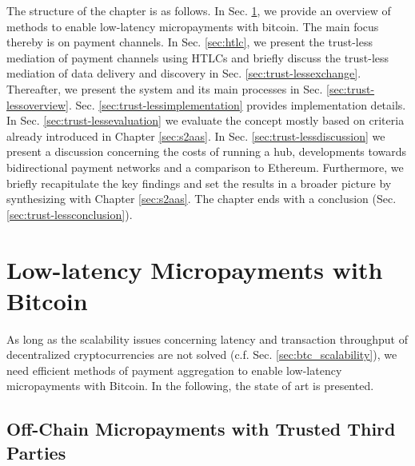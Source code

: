 The structure of the chapter is as follows. In Sec. \ref{sec:micropayments}, we provide an overview of methods to enable low-latency micropayments with bitcoin. The main focus thereby is on payment channels. In Sec. \ref{sec:htlc}, we present the trust-less mediation of payment channels using \ac{HTLC}s and briefly discuss the trust-less mediation of data delivery and discovery in Sec. \ref{sec:trust-lessexchange}. Thereafter, we present the system and its main processes in Sec. \ref{sec:trust-lessoverview}. Sec. \ref{sec:trust-lessimplementation} provides implementation details. In Sec. \ref{sec:trust-lessevaluation} we evaluate the concept mostly based on criteria already introduced in Chapter \ref{sec:s2aas}. In Sec. \ref{sec:trust-lessdiscussion} we present a discussion concerning the costs of running a hub, developments towards bidirectional payment networks and a comparison to Ethereum. Furthermore, we briefly recapitulate the key findings and set the results in a broader picture by synthesizing with Chapter \ref{sec:s2aas}. The chapter ends with a conclusion (Sec. \ref{sec:trust-lessconclusion}).


\section{Low-latency Micropayments with Bitcoin}
\label{sec:micropayments}

As long as the scalability issues concerning latency and transaction throughput of decentralized cryptocurrencies are not solved (c.f. Sec. \ref{sec:btc_scalability}), we need efficient methods of payment aggregation to enable low-latency micropayments with Bitcoin. In the following, the state of art is presented. 


\subsection{Off-Chain Micropayments with Trusted Third Parties}

